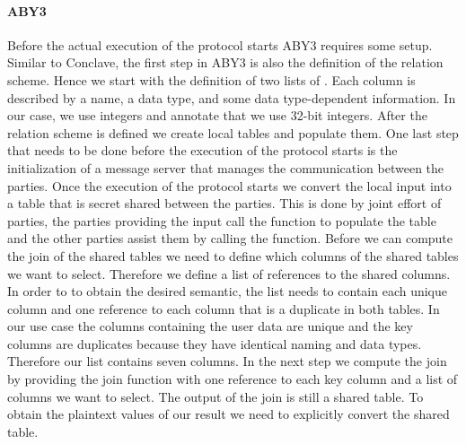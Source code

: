 \paragraph{ABY3}
Before the actual execution of the protocol starts ABY3 requires some setup. Similar to Conclave, the first step in ABY3 is also the definition of the relation scheme. Hence we start with the definition of two lists of . Each column is described by a name, a data type, and some data type-dependent information. In our case, we use integers and annotate that we use 32-bit integers. After the relation scheme is defined we create local tables and populate them. One last step that needs to be done before the execution of the protocol starts is the initialization of a message server that manages the communication between the parties.
Once the execution of the protocol starts we convert the local input into a table that is secret shared between the parties. 
This is done by joint effort of parties, the parties providing the input call the  function to populate the table and the other parties assist them by calling the  function. 
Before we can compute the join of the shared tables we need to define which columns of the shared tables we want to select. Therefore we define a list of references to the shared columns. In order to to obtain the desired semantic, the list needs to contain each unique column and one reference to each column that is a duplicate in both tables. 
In our use case the columns containing the user data are unique and the key columns are duplicates because they have identical naming and data types. Therefore our list contains seven columns. In the next step we compute the join by providing the join function with one reference to each key column and a list of columns we want to select. The output of the join is still a shared table. To obtain the plaintext values of our result we need to explicitly convert the shared table.  


